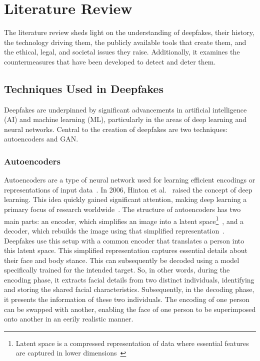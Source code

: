 
\chapter{Literature Review}\label{chapter:literature}
The literature review sheds light on the understanding of deepfakes, their history,
the technology driving them, the publicly available tools that create them, and
the ethical, legal, and societal issues they raise. Additionally, it examines the
countermeasures that have been developed to detect and deter them.

\section{Techniques Used in Deepfakes}\label{chapter:techniques}
Deepfakes are underpinned by significant advancements in artificial intelligence (\ac{AI})
and machine learning (ML), particularly in the areas of deep learning and neural
networks. Central to the creation of deepfakes are two techniques:
autoencoders and \ac{GAN}.

\subsection{Autoencoders}
Autoencoders are a type of neural network used for learning
efficient encodings or representations of input data~\cite{doi:10.1126/science.1127647}.
In 2006, Hinton et al.~\cite{10.1145/3297156.3297210,doi:10.1126/science.1127647}
raised the concept of deep learning. This idea quickly gained significant attention,
making deep learning a primary focus of research worldwide~\cite{simonyan2015deep}.
The structure of autoencoders has two main parts: an encoder, which simplifies an
image into a latent space\footnote{Latent space is a compressed representation of data where essential
	features are captured in lower dimensions~\cite{enwiki:1169655673}}~\cite{latent-space-medium}, and a decoder,
which rebuilds the image using that simplified representation~\cite{latent-space-medium,enwiki:1170192786}. Deepfakes use this
setup with a common encoder that translates a person into this latent space. This simplified
representation captures essential details about their face and body stance. This can subsequently
be decoded using a model specifically trained for the intended target. So, in other words,
during the encoding phase, it extracts facial details from two distinct individuals,
identifying and storing the shared facial characteristics. Subsequently, in the decoding phase,
it presents the information of these two individuals. The encoding of one person can be
swapped with another, enabling the face of one person to be superimposed onto another
in an eerily realistic manner.

